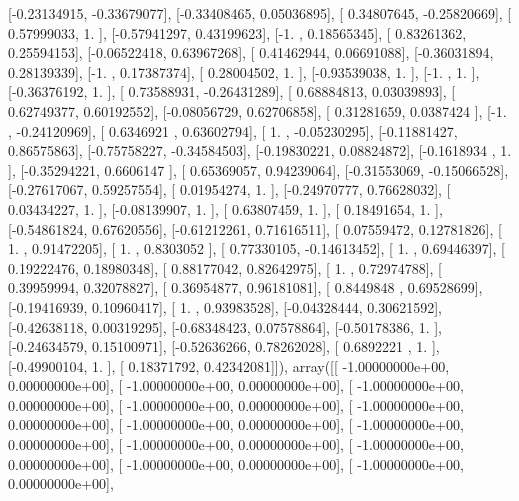 \documentclass{article}
\begin{document}
       [-0.23134915, -0.33679077],
       [-0.33408465,  0.05036895],
       [ 0.34807645, -0.25820669],
       [ 0.57999033,  1.        ],
       [-0.57941297,  0.43199623],
       [-1.        ,  0.18565345],
       [ 0.83261362,  0.25594153],
       [-0.06522418,  0.63967268],
       [ 0.41462944,  0.06691088],
       [-0.36031894,  0.28139339],
       [-1.        ,  0.17387374],
       [ 0.28004502,  1.        ],
       [-0.93539038,  1.        ],
       [-1.        ,  1.        ],
       [-0.36376192,  1.        ],
       [ 0.73588931, -0.26431289],
       [ 0.68884813,  0.03039893],
       [ 0.62749377,  0.60192552],
       [-0.08056729,  0.62706858],
       [ 0.31281659,  0.0387424 ],
       [-1.        , -0.24120969],
       [ 0.6346921 ,  0.63602794],
       [ 1.        , -0.05230295],
       [-0.11881427,  0.86575863],
       [-0.75758227, -0.34584503],
       [-0.19830221,  0.08824872],
       [-0.1618934 ,  1.        ],
       [-0.35294221,  0.6606147 ],
       [ 0.65369057,  0.94239064],
       [-0.31553069, -0.15066528],
       [-0.27617067,  0.59257554],
       [ 0.01954274,  1.        ],
       [-0.24970777,  0.76628032],
       [ 0.03434227,  1.        ],
       [-0.08139907,  1.        ],
       [ 0.63807459,  1.        ],
       [ 0.18491654,  1.        ],
       [-0.54861824,  0.67620556],
       [-0.61212261,  0.71616511],
       [ 0.07559472,  0.12781826],
       [ 1.        ,  0.91472205],
       [ 1.        ,  0.8303052 ],
       [ 0.77330105, -0.14613452],
       [ 1.        ,  0.69446397],
       [ 0.19222476,  0.18980348],
       [ 0.88177042,  0.82642975],
       [ 1.        ,  0.72974788],
       [ 0.39959994,  0.32078827],
       [ 0.36954877,  0.96181081],
       [ 0.8449848 ,  0.69528699],
       [-0.19416939,  0.10960417],
       [ 1.        ,  0.93983528],
       [-0.04328444,  0.30621592],
       [-0.42638118,  0.00319295],
       [-0.68348423,  0.07578864],
       [-0.50178386,  1.        ],
       [-0.24634579,  0.15100971],
       [-0.52636266,  0.78262028],
       [ 0.6892221 ,  1.        ],
       [-0.49900104,  1.        ],
       [ 0.18371792,  0.42342081]]), array([[ -1.00000000e+00,   0.00000000e+00],
       [ -1.00000000e+00,   0.00000000e+00],
       [ -1.00000000e+00,   0.00000000e+00],
       [ -1.00000000e+00,   0.00000000e+00],
       [ -1.00000000e+00,   0.00000000e+00],
       [ -1.00000000e+00,   0.00000000e+00],
       [ -1.00000000e+00,   0.00000000e+00],
       [ -1.00000000e+00,   0.00000000e+00],
       [ -1.00000000e+00,   0.00000000e+00],
       [ -1.00000000e+00,   0.00000000e+00],
       [ -1.00000000e+00,   0.00000000e+00],
\end{document}
